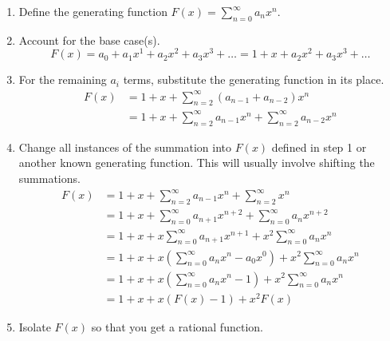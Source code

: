 \documentclass[letterpaper]{article}
\begin{document}
\begin{enumerate}[(1)]
    \item Define the generating function $F(x) = \sum_{n = 0}^{\infty} a_{n} x^{n}$. 
    \item Account for the base case(s). 
    \[F(x) = \boxed{a_0 + a_1 x^1} + a_2 x^2 + a_3 x^3 + \dots = \boxed{1 + x} + a_2 x^2 + a_3 x^3 + \dots\]
    
    \item For the remaining $a_i$ terms, substitute the generating function in its place. 
    \begin{equation*}
        \begin{aligned}
            F(x) &= 1 + x + \boxed{\sum_{n = 2}^{\infty} (a_{n - 1} + a_{n - 2}) x^n} \\ 
                &= 1 + x + \boxed{\sum_{n = 2}^{\infty} a_{n - 1} x^n + \sum_{n = 2}^{\infty} a_{n - 2} x^n}
        \end{aligned}
    \end{equation*}

    \item Change all instances of the summation into $F(x)$ defined in step 1 or another known generating function. This will usually involve shifting the summations.
    \begin{equation*}
        \begin{aligned}
            F(x) &= 1 + x + \sum_{n = 2}^{\infty} a_{n - 1} x^n + \sum_{n = 2}^{\infty} x^n \\ 
                &= 1 + x + \sum_{n = 0}^{\infty} a_{n + 1} x^{n + 2} + \sum_{n = 0}^{\infty} a_{n} x^{n + 2} \\ 
                &= 1 + x + x \sum_{n = 0}^{\infty} a_{n + 1} x^{n + 1} + x^2 \sum_{n = 0}^{\infty} a_n x^n \\ 
                &= 1 + x + x \left(\sum_{n = 0}^{\infty} a_n x^n - a_0 x^0\right) + x^2 \sum_{n = 0}^{\infty} a_n x^n \\ 
                &= 1 + x + x \left(\sum_{n = 0}^{\infty} a_n x^n - 1\right) + x^2 \sum_{n = 0}^{\infty} a_n x^n \\ 
                &= 1 + x + x \left(F(x) - 1\right) + x^2 F(x)
        \end{aligned}
    \end{equation*}

    \item Isolate $F(x)$ so that you get a rational function. 
    
    \bigskip 


\end{enumerate}
\end{document}
